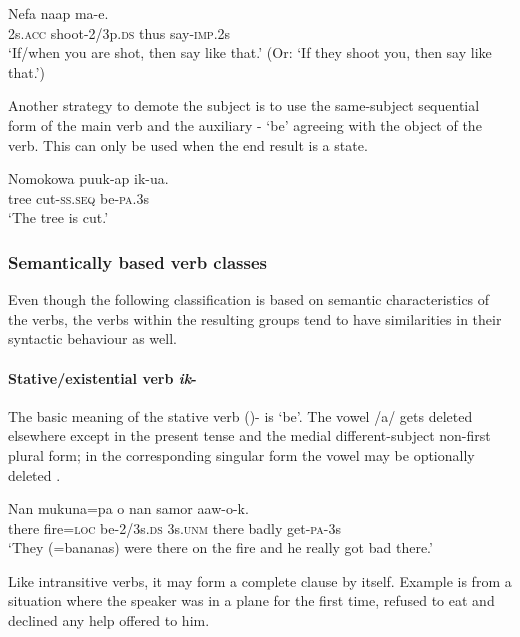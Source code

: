 \ea%
\label{ex:3:x1010}
\gll Nefa  naap ma-e. \\
2s.\textsc{acc} shoot-2/3p.\textsc{ds} thus say-\textsc{imp}.2s\\
\glt`If/when you are shot, then say like that.' (Or: `If they shoot you, then say like that.')
\z

Another strategy to demote the subject is to use the same-subject sequential form of the main verb and the auxiliary - `be' agreeing with the object of the verb. This can only be used when the end result is a state. 

\ea%
\label{ex:3:x1011}
\gll Nomokowa puuk-ap ik-ua. \\
tree cut-\textsc{ss}.\textsc{seq} be-\textsc{pa}.3s\\
\glt`The tree is cut.'
\z

\subsubsection{Semantically based verb classes} \label{sec:3.8.4.4}
{}
Even though the following classification is based on semantic characteristics of the verbs, the verbs within the resulting groups tend to have similarities in their syntactic behaviour as well.

\paragraph{Stative/existential verb \textit{ik}-} \label{sec:3.8.4.4.1}
{}
The basic meaning of the stative verb ()- is `be'. The vowel /a/ gets deleted elsewhere except in the present tense and the medial different-subject non-first plural form; in the corresponding singular form the vowel may be optionally deleted . 

\ea%
\label{ex:3:x257}
\gll Nan mukuna=pa  o nan samor aaw-o-k. \\
there fire=\textsc{loc} be-2/3s.\textsc{ds} 3s.\textsc{unm} there badly get-\textsc{pa}-3s\\
\glt`They (=bananas) were there on the fire and he really got bad there.'
\z

Like intransitive verbs, it may form a complete clause by itself. Example  is from a situation where the speaker was in a plane for the first time, refused to eat and declined any help offered to him.

